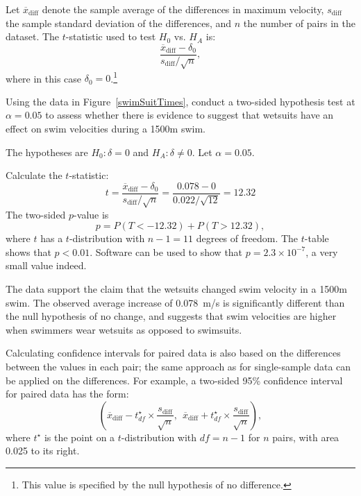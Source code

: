 Let $\overline{x}_{\text{diff}}$ denote the sample average of the differences in maximum velocity, $s_{\text{diff}}$ the sample standard deviation of the differences, and $n$ the number of pairs in the dataset. The $t$-statistic used to test $H_0$ vs. $H_A$ is:
\[\frac{\overline{x}_{\text{diff}} - \delta_0} {s_{\text{diff}}/\sqrt{n}},\]
where in this case $\delta_0 = 0$.\footnote{This value is specified by the null hypothesis of no difference.}

\begin{examplewrap}
\begin{nexample}{Using the data in Figure~\ref{swimSuitTimes}, conduct a two-sided hypothesis test at $\alpha = 0.05$ to assess whether there is evidence to suggest that wetsuits have an effect on swim velocities during a 1500m swim.}

The hypotheses are $H_0: \delta = 0$ and $H_A: \delta \neq 0$. Let $\alpha = 0.05$. 

Calculate the $t$-statistic:
\[t = \frac{\overline{x}_{\text{diff}} - \delta_0} {s_{\text{diff}}/\sqrt{n}} = \frac{0.078 - 0}{0.022/\sqrt{12}} = 12.32\]
The two-sided $p$-value is
$$ p = P(T < -\text{12.32}) + P(T > \text{12.32}), $$
where $t$ has a $t$-distribution with $n-1 = 11$  degrees of freedom.
The $t$-table shows that $p < 0.01$. Software can be used to show that $p = 2.3 \times 10^{-7}$, a very small value indeed.  
	
The data support the claim that the wetsuits changed swim velocity in a 1500m swim. The observed average increase of 0.078~m/s is significantly different than the null hypothesis of no change, and suggests that swim velocities are higher when swimmers wear wetsuits as opposed to swimsuits.	
\end{nexample}
\end{examplewrap}


Calculating confidence intervals for paired data is also based on the differences between the values in each pair; the same approach as for single-sample data can be applied on the differences. For example, a two-sided 95\% confidence interval for paired data has the form:
\[ \left(
  \overline{x}_{\text{diff}} - t^\star_{df} \times \frac{s_{\text{diff}}}{\sqrt{n}},
  \:\: \overline{x}_{\text{diff}} + t^\star_{df} \times \frac{s_{\text{diff}}}{\sqrt{n}} \right), 
\]
where $t^\star$ is the point on a $t$-distribution with $df = n - 1$ for $n$ pairs, with area 0.025 to its right.

